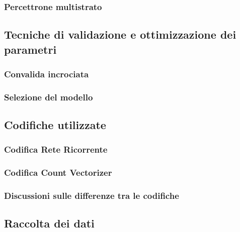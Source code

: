 \documentclass{article}
\begin{document}
\subsubsection{Percettrone multistrato}

\subsection{Tecniche di validazione e ottimizzazione dei parametri}
\subsubsection{Convalida incrociata} %
\subsubsection{Selezione del modello} %

\subsection{Codifiche utilizzate}
\subsubsection{Codifica Rete Ricorrente}
\subsubsection{Codifica Count Vectorizer}
\subsubsection{Discussioni sulle differenze tra le codifiche}

\subsection{Raccolta dei dati}

\end{document}

